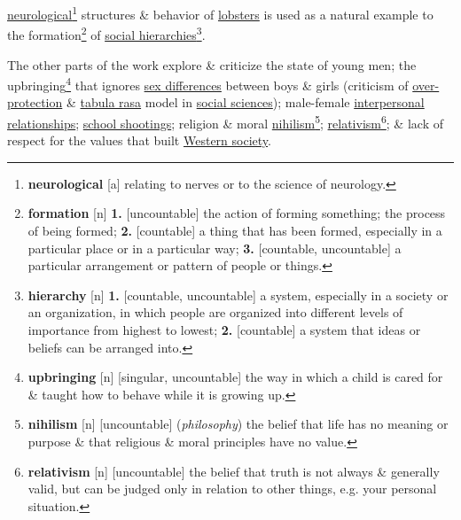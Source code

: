 \documentclass{article}
\begin{document}
\href{https://en.wikipedia.org/wiki/Neurology}{neurological}\footnote{\textbf{neurological} [a] relating to nerves or to the science of neurology.} structures \& behavior of \href{https://en.wikipedia.org/wiki/Lobsters}{lobsters} is used as a natural example to the formation\footnote{\textbf{formation} [n] \textbf{1.} [uncountable] the action of forming something; the process of being formed; \textbf{2.} [countable] a thing that has been formed, especially in a particular place or in a particular way; \textbf{3.} [countable, uncountable] a particular arrangement or pattern of people or things.} of \href{https://en.wikipedia.org/wiki/Hierarchy}{social hierarchies}\footnote{\textbf{hierarchy} [n] \textbf{1.} [countable, uncountable] a system, especially in a society or an organization, in which people are organized into different levels of importance from highest to lowest; \textbf{2.} [countable] a system that ideas or beliefs can be arranged into.}.

The other parts of the work explore \& criticize the state of young men; the upbringing\footnote{\textbf{upbringing} [n] [singular, uncountable] the way in which a child is cared for \& taught how to behave while it is growing up.} that ignores \href{https://en.wikipedia.org/wiki/Sex_differences_in_humans}{sex differences} between boys \& girls (criticism of \href{https://en.wikipedia.org/wiki/Overprotective}{over-protection} \& \href{https://en.wikipedia.org/wiki/Tabula_rasa}{tabula rasa} model in \href{https://en.wikipedia.org/wiki/Social_science}{social sciences}); male-female \href{https://en.wikipedia.org/wiki/Interpersonal_relationship}{interpersonal relationships}; \href{https://en.wikipedia.org/wiki/School_shooting}{school shootings}; religion \& moral \href{https://en.wikipedia.org/wiki/Nihilism}{nihilism}\footnote{\textbf{nihilism} [n] [uncountable] (\textit{philosophy}) the belief that life has no meaning or purpose \& that religious \& moral principles have no value.}; \href{https://en.wikipedia.org/wiki/Relativism}{relativism}\footnote{\textbf{relativism} [n] [uncountable] the belief that truth is not always \& generally valid, but can be judged only in relation to other things, e.g. your personal situation.}; \& lack of respect for the values that built \href{https://en.wikipedia.org/wiki/Western_world}{Western society}.
\end{document}

